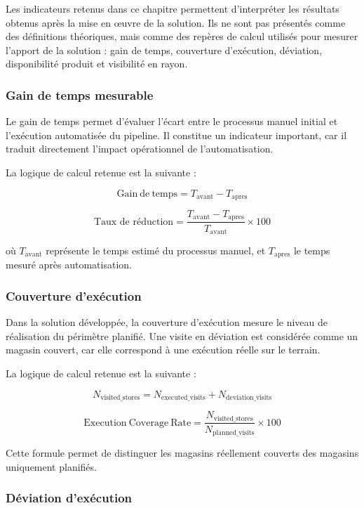 Les indicateurs retenus dans ce chapitre permettent d’interpréter les résultats obtenus après la mise en œuvre de la solution. Ils ne sont pas présentés comme des définitions théoriques, mais comme des repères de calcul utilisés pour mesurer l’apport de la solution : gain de temps, couverture d’exécution, déviation, disponibilité produit et visibilité en rayon.

\subsubsection{Gain de temps mesurable}

Le gain de temps permet d’évaluer l’écart entre le processus manuel initial et l’exécution automatisée du pipeline. Il constitue un indicateur important, car il traduit directement l’impact opérationnel de l’automatisation.

La logique de calcul retenue est la suivante :

\[
\mathrm{Gain\ de\ temps} =
T_{\mathrm{avant}} - T_{\mathrm{apres}}
\]

\[
\text{Taux de réduction} =
\frac{T_{\mathrm{avant}} - T_{\mathrm{apres}}}
{T_{\mathrm{avant}}}
\times 100
\]

où \(T_{\mathrm{avant}}\) représente le temps estimé du processus manuel, et \(T_{\mathrm{apres}}\) le temps mesuré après automatisation.

\subsubsection{Couverture d’exécution}

Dans la solution développée, la couverture d’exécution mesure le niveau de réalisation du périmètre planifié. Une visite en déviation est considérée comme un magasin couvert, car elle correspond à une exécution réelle sur le terrain.

La logique de calcul retenue est la suivante :

\[
N_{\mathrm{visited\_stores}} =
N_{\mathrm{executed\_visits}} + N_{\mathrm{deviation\_visits}}
\]

\[
\mathrm{Execution\ Coverage\ Rate} =
\frac{N_{\mathrm{visited\_stores}}}
{N_{\mathrm{planned\_visits}}}
\times 100
\]

Cette formule permet de distinguer les magasins réellement couverts des magasins uniquement planifiés.

\subsubsection{Déviation d’exécution}


